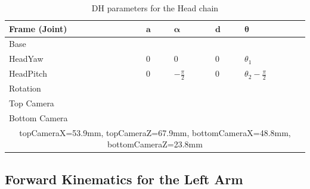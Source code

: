 \begin{table}[t!]
\centering
\caption{DH parameters for the Head chain}
\begin{tabular}{|l|>{\centering\arraybackslash}m{2.55cm}|>{\centering\arraybackslash}m{2.55cm}|>{\centering\arraybackslash}m{2.55cm}|>{\centering\arraybackslash}m{2.55cm}|}
\hline
\textbf{Frame (Joint)} & $\mathbf{a}$ & $\boldsymbol{\alpha}$ & $\mathbf{d}$ & $\boldsymbol{\theta}$\\ \hline
Base & \multicolumn{4}{c|}{$A(0,0,\text{\footnotesize{NeckOffsetZ}})$} \\ \hline
HeadYaw & $0$ & $0$ & $0$ & $\theta_1$ \\ \hline
HeadPitch & $0$ & $-\frac{\pi}{2}$ & $0$ & $\theta_2 - \frac{\pi}{2}$ \\ \hline
Rotation & \multicolumn{4}{c|}{$R_x(\frac{\pi}{2})R_y(\frac{\pi}{2})$} \\ \hline
Top Camera & \multicolumn{4}{c|}{$A(\text{\footnotesize{topCameraX}},0,\text{\footnotesize{topCameraZ}})$} \\ \hline
Bottom Camera & \multicolumn{4}{c|}{$A(\text{\footnotesize{bottomCameraX}},0,\text{\footnotesize{bottomCameraZ}})$} \\ \hline
\multicolumn{5}{|c|}{\footnotesize{topCameraX=53.9mm, topCameraZ=67.9mm, bottomCameraX=48.8mm, bottomCameraZ=23.8mm}} \\ \hline
\end{tabular}
\label{tab:DHhead}
\end{table}

\subsection{Forward Kinematics for the Left Arm}

